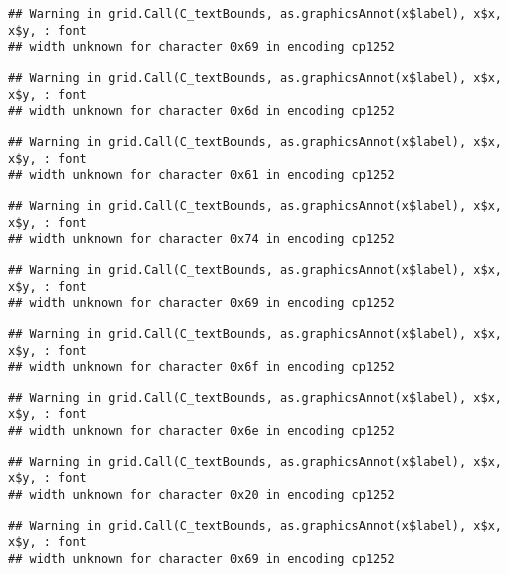 \documentclass[
]{article}
\begin{document}
\begin{verbatim}
## Warning in grid.Call(C_textBounds, as.graphicsAnnot(x$label), x$x, x$y, : font
## width unknown for character 0x69 in encoding cp1252
\end{verbatim}

\begin{verbatim}
## Warning in grid.Call(C_textBounds, as.graphicsAnnot(x$label), x$x, x$y, : font
## width unknown for character 0x6d in encoding cp1252
\end{verbatim}

\begin{verbatim}
## Warning in grid.Call(C_textBounds, as.graphicsAnnot(x$label), x$x, x$y, : font
## width unknown for character 0x61 in encoding cp1252
\end{verbatim}

\begin{verbatim}
## Warning in grid.Call(C_textBounds, as.graphicsAnnot(x$label), x$x, x$y, : font
## width unknown for character 0x74 in encoding cp1252
\end{verbatim}

\begin{verbatim}
## Warning in grid.Call(C_textBounds, as.graphicsAnnot(x$label), x$x, x$y, : font
## width unknown for character 0x69 in encoding cp1252
\end{verbatim}

\begin{verbatim}
## Warning in grid.Call(C_textBounds, as.graphicsAnnot(x$label), x$x, x$y, : font
## width unknown for character 0x6f in encoding cp1252
\end{verbatim}

\begin{verbatim}
## Warning in grid.Call(C_textBounds, as.graphicsAnnot(x$label), x$x, x$y, : font
## width unknown for character 0x6e in encoding cp1252
\end{verbatim}

\begin{verbatim}
## Warning in grid.Call(C_textBounds, as.graphicsAnnot(x$label), x$x, x$y, : font
## width unknown for character 0x20 in encoding cp1252
\end{verbatim}

\begin{verbatim}
## Warning in grid.Call(C_textBounds, as.graphicsAnnot(x$label), x$x, x$y, : font
## width unknown for character 0x69 in encoding cp1252
\end{verbatim}
\end{document}
